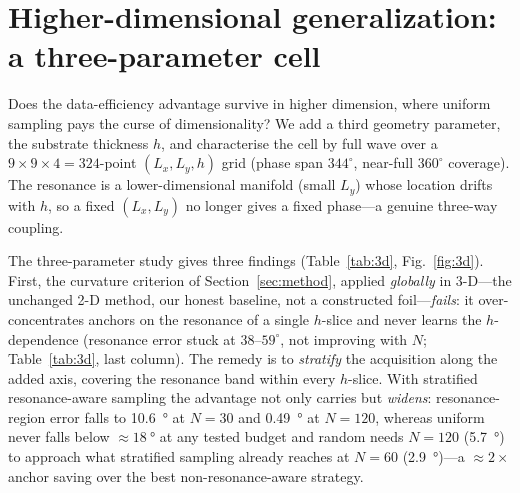 \documentclass[11pt]{article}
\begin{document}
\section{Higher-dimensional generalization: a three-parameter cell}\label{sec:3d}
Does the data-efficiency advantage survive in higher dimension, where uniform sampling pays the curse of
dimensionality? We add a third geometry parameter, the substrate thickness $h$, and characterise the cell
by full wave over a $9\times9\times4=324$-point $(L_x,L_y,h)$ grid (phase span $344^\circ$, near-full
$360^\circ$ coverage). The resonance is a lower-dimensional manifold (small $L_y$) whose location drifts
with $h$, so a fixed $(L_x,L_y)$ no longer gives a fixed phase---a genuine three-way coupling.

The three-parameter study gives three findings (Table~\ref{tab:3d}, Fig.~\ref{fig:3d}). First, the curvature criterion of
Section~\ref{sec:method}, applied \emph{globally} in 3-D---the unchanged 2-D method, our honest baseline,
not a constructed foil---\emph{fails}: it over-concentrates anchors on
the resonance of a single $h$-slice and never learns the $h$-dependence (resonance error stuck at
$38$--$59^\circ$, not improving with $N$; Table~\ref{tab:3d}, last column). The remedy is to
\emph{stratify} the acquisition along the added axis, covering the resonance band within every $h$-slice.
With stratified resonance-aware sampling the advantage not only carries but \emph{widens}: resonance-region
error falls to \SI{10.6}{\degree} at $N\!=\!30$ and \SI{0.49}{\degree} at $N\!=\!120$, whereas uniform never
falls below $\approx\!\SI{18}{\degree}$ at any tested budget and random needs $N\!=\!120$ (\SI{5.7}{\degree})
to approach what stratified sampling already reaches at $N\!=\!60$ (\SI{2.9}{\degree})---a $\approx\!2\times$
anchor saving over the best non-resonance-aware strategy.
\end{document}
